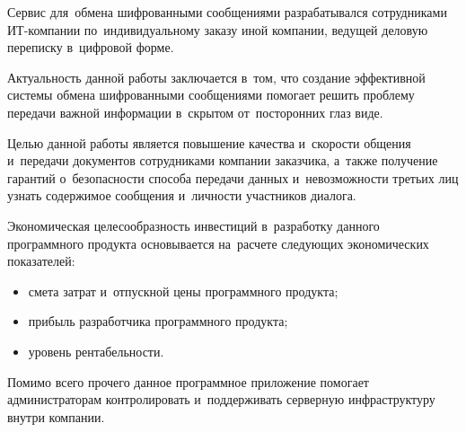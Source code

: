 Сервис для~обмена шифрованными сообщениями разрабатывался сотрудниками ИТ-компании по~индивидуальному заказу иной компании, ведущей деловую переписку в~цифровой форме.

Актуальность данной работы заключается в~том, что создание эффективной системы обмена шифрованными сообщениями помогает решить проблему передачи важной информации в~скрытом от~посторонних глаз виде.

Целью данной работы является повышение качества и~скорости общения и~передачи документов сотрудниками компании заказчика, а~также получение гарантий о~безопасности способа передачи данных и~невозможности третьих лиц узнать содержимое сообщения и~личности участников диалога.

Экономическая целесообразность инвестиций в~разработку данного программного продукта основывается на~расчете следующих экономических показателей:
\begin{itemize}
    \item смета затрат и~отпускной цены программного продукта;
    \item прибыль разработчика программного продукта;
    \item уровень рентабельности.
\end{itemize}

Помимо всего прочего данное программное приложение помогает администраторам контролировать и~поддерживать серверную инфраструктуру внутри компании.